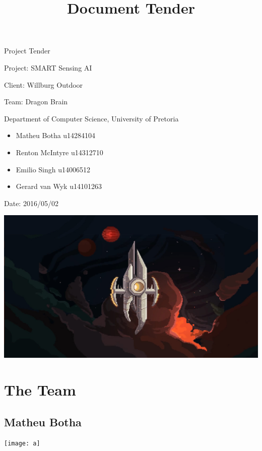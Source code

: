 \documentclass[12pt]{article}
\begin{document}
\title{Document Tender}

\begin{titlepage}
\begin{huge}
\begin{center}
Project Tender

Project: SMART Sensing AI
\\
\begin{LARGE}
Client: Willburg Outdoor
\end{LARGE}

Team: Dragon Brain
\\
\begin{small}
Department of Computer Science, University of Pretoria
\\
\begin{itemize}
\item Matheu Botha u14284104
\item Renton McIntyre u14312710
\item Emilio Singh u14006512
\item Gerard van Wyk u14101263
\end{itemize}


Date: 2016/05/02

\end{small}

\includegraphics[scale=0.2]{test}
\end{center}

\end{huge}


\end{titlepage}

\pagebreak

\section{The Team}
\subsection{Matheu Botha}
\texttt{[image: a]}
\end{document}
